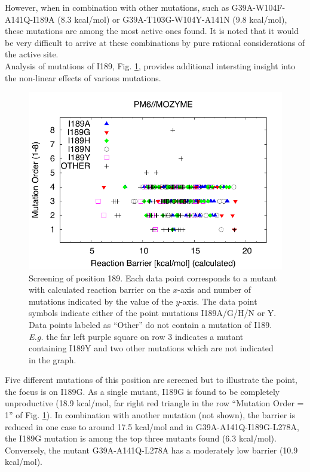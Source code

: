 However, when in combination with other mutations, such as G39A-W104F-A141Q-I189A (8.3 kcal/mol) or G39A-T103G-W104Y-A141N (9.8 kcal/mol), these mutations are among the most active ones found.
It is noted that it would be very difficult to arrive at these combinations by pure rational considerations of the active site.\\
Analysis of mutations of I189, Fig. \ref{fig:i189g}, provides additional intersting insight into the non-linear effects of various mutations.
\begin{figure}[htbp] 
\includegraphics[width=0.95\linewidth]{011-diag_eval_scre_setL-i189.pdf}
\caption{
Screening of position 189.
Each data point corresponds to a mutant with calculated reaction barrier on the $x$-axis and number of mutations indicated by the value of the $y$-axis.
The data point symbols indicate either of the point mutations I189A/G/H/N or Y.
Data points labeled as ``Other'' do not contain a mutation of I189.
\textit{E.g.} the far left purple square on row 3 indicates a mutant containing I189Y and two other mutations which are not indicated in the graph.
}
\label{fig:i189g}
\end{figure}
Five different mutations of this position are screened but to illustrate the point, the focus is on I189G.
As a single mutant, I189G is found to be completely unproductive (18.9 kcal/mol, far right red triangle in the row ``Mutation Order = 1'' of Fig. \ref{fig:i189g}).
In combination with another mutation (not shown), the barrier is reduced in one case to around 17.5 kcal/mol and in G39A-A141Q-I189G-L278A, the I189G mutation is among the top three mutants found (6.3 kcal/mol).
Conversely, the mutant G39A-A141Q-L278A has a moderately low barrier (10.9 kcal/mol).
